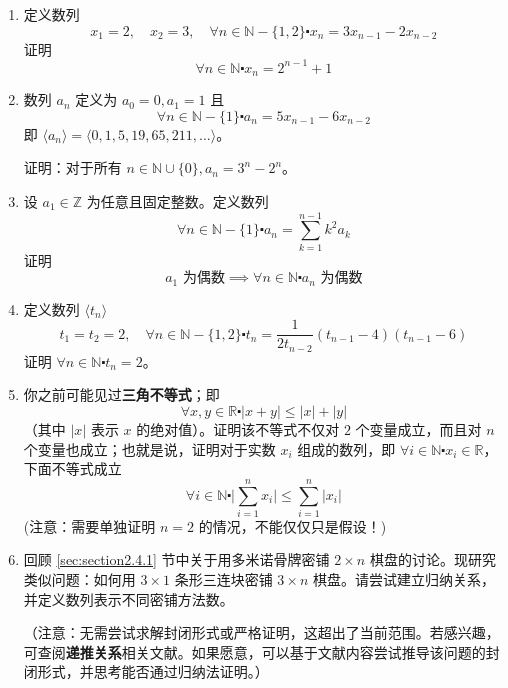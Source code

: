 \begin{enumerate}[label=(\arabic*)]
    \item 定义数列
        \[x_1=2, \quad x_2=3, \quad \forall n \in \mathbb{N}-\{1,2\} \centerdot x_n=3x_{n-1}-2x_{n-2}\]
        证明
        \[\forall n \in \mathbb{N} \centerdot x_n = 2^{n-1} + 1\]
    \item 数列 $a_n$ 定义为 $a_0 = 0, a_1 = 1$ 且
        \[\forall n \in \mathbb{N}-\{1\} \centerdot a_n=5x_{n-1}-6x_{n-2}\]
        即 $\langle a_n \rangle = \langle 0, 1, 5, 19, 65, 211, \dots \rangle$。
        
        证明：对于所有 $n \in \mathbb{N} \cup \{0\}, a_n = 3^n-2^n$。
    \item 设 $a_1 \in \mathbb{Z}$ 为任意且固定整数。定义数列
        \[\forall n \in \mathbb{N} - \{1\} \centerdot a_n = \sum_{k=1}^{n-1}k^2a_k\]
        证明
        \[a_1 \text{\ 为偶数} \implies \forall n \in \mathbb{N} \centerdot a_n \text{\ 为偶数}\]
    \item 定义数列 $\langle t_n \rangle$
        \[t_1=t_2=2, \quad \forall n \in \mathbb{N}-\{1,2\} \centerdot t_n=\frac{1}{2t_{n-2}}(t_{n-1}-4)(t_{n-1}-6)\]
        证明 $\forall n \in \mathbb{N} \centerdot t_n=2$。
    \item 你之前可能见过\textbf{三角不等式}；即
        \[\forall x,y \in \mathbb{R} \centerdot |x+y| \le |x| + |y|\]
        （其中 $|x|$ 表示 $x$ 的绝对值）。证明该不等式不仅对 $2$ 个变量成立，而且对 $n$ 个变量也成立；也就是说，证明对于实数 $x_i$ 组成的数列，即 $\forall i \in \mathbb{N} \centerdot x_i \in \mathbb{R}$，下面不等式成立
        \[\forall i \in \mathbb{N} \centerdot \vert \sum_{i=1}^{n} x_i \vert \le \sum_{i=1}^{n} |x_i|\]
        (注意：需要单独证明 $n = 2$ 的情况，不能仅仅只是假设！)
    \item 回顾 \ref{sec:section2.4.1} 节中关于用多米诺骨牌密铺 $2 \times n$ 棋盘的讨论。现研究类似问题：如何用 $3 \times 1$ 条形三连块密铺 $3 \times n$ 棋盘。请尝试建立归纳关系，并定义数列表示不同密铺方法数。

    （注意：无需尝试求解封闭形式或严格证明，这超出了当前范围。若感兴趣，可查阅\textbf{递推关系}相关文献。如果愿意，可以基于文献内容尝试推导该问题的封闭形式，并思考能否通过归纳法证明。）
\end{enumerate}